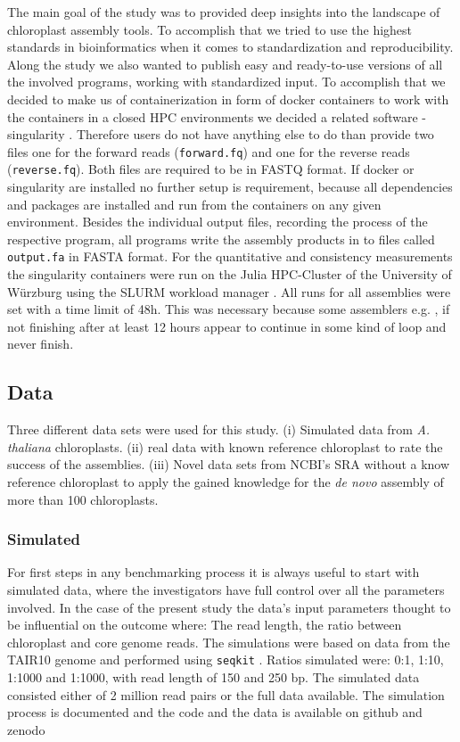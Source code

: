 The main goal of the study was to provided deep insights into the landscape of chloroplast assembly tools. To
accomplish that we tried to use the highest standards in bioinformatics when it comes to standardization and
reproducibility. Along the study we also wanted to publish easy and ready-to-use versions of all the involved
programs, working with standardized input. To accomplish that we decided to make us of containerization in
form of docker containers \cite{merkel2014docker} to work with the containers in a closed HPC environments we
decided a related software - singularity \cite{kurtzer2017singularity}. Therefore users do not have anything
else to do than provide two files one for the forward reads (\texttt{forward.fq}) and one for the reverse
reads (\texttt{reverse.fq}). Both files are required to be in FASTQ format. If docker or singularity are
installed no further setup is requirement, because all dependencies and packages are installed and run from
the containers on any given environment. Besides the individual output files, recording the process of the
respective program, all programs write the assembly products in to files called \texttt{output.fa} in FASTA
format.  For the quantitative and consistency measurements the singularity containers were run on the Julia
HPC-Cluster of the University of W\"{u}rzburg using the SLURM workload manager \cite{Jette02slurm}.  All runs
for all assemblies were set with a time limit of 48h. This was necessary because some assemblers e.g. \ioga,
if not finishing after at least 12 hours appear to continue in some kind of loop and never finish.


\subsection{Data}
Three different data sets were used for this study. (i) Simulated data from \textit{A. thaliana}
chloroplasts. (ii) real data with known reference chloroplast to rate the success of the assemblies. (iii)
Novel data sets from NCBI's SRA without a know reference chloroplast to apply the gained knowledge for the
\textit{de novo} assembly of more than 100 chloroplasts.

\subsubsection{Simulated}

For first steps in any benchmarking process it is always useful to start with simulated data, where the
investigators have full control over all the parameters involved. In the case of the present study the data's
input parameters thought to be influential on the outcome where: The read length, the ratio between
chloroplast and core genome reads. The simulations were based on data from the TAIR10 genome \cite{tair10} and
performed using \texttt{seqkit} \cite{seqkit}. Ratios simulated were: 0:1, 1:10, 1:1000 and 1:1000, with read
length of 150 and 250 bp. The simulated data consisted either of 2 million read pairs or the full data
available. The simulation process is documented and the code and the data is available on github and zenodo
\cite{zenododataset}

